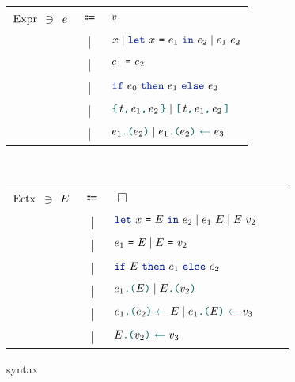 \begin{figure}[tp]
  \begin{tabular}{rcl}
            $\datalangExpr[]$
            $\ni$
            $\datalangExpr$
            & $\Coloneqq$ &
            $\datalangVal$
        \\
            & | &
            $\datalangVar \mid \datalangLet{\datalangVar}{\datalangExpr_1}{\datalangExpr_2} \mid \datalangCall{\datalangExpr_1}{\datalangExpr_2}$
        \\
            & | &
            $\datalangEq{\datalangExpr_1}{\datalangExpr_2}$
        \\
            & | &
            $\datalangIf{\datalangExpr_0}{\datalangExpr_1}{\datalangExpr_2}$
        \\
            & | &
            $\datalangBlock{\datalangTag}{\datalangExpr_1}{\datalangExpr_2} \mid \datalangBlockDet{\datalangTag}{\datalangExpr_1}{\datalangExpr_2}$
        \\
            & | &
            $\datalangLoad{\datalangExpr_1}{\datalangExpr_2} \mid \datalangStore{\datalangExpr_1}{\datalangExpr_2}{\datalangExpr_3}$
  \end{tabular}~
  \begin{tabular}{lclcl}
            $\datalangEctx[]$
            $\ni$
            $\datalangEctx$
            & $\Coloneqq$ &
            $\Box$
        \\
            & | &
            $\datalangLet{\datalangVar}{\datalangEctx}{\datalangExpr_2} \mid \datalangCall{\datalangExpr_1}{\datalangEctx} \mid \datalangCall{\datalangEctx}{\datalangVal_2}$
        \\
            & | &
            $\datalangEq{\datalangExpr_1}{\datalangEctx} \mid \datalangEq{\datalangEctx}{\datalangVal_2}$
        \\
            & | &
            $\datalangIf{\datalangEctx}{\datalangExpr_1}{\datalangExpr_2}$
        \\
            & | &
            $\datalangLoad{\datalangExpr_1}{\datalangEctx} \mid \datalangLoad{\datalangEctx}{\datalangVal_2}$
        \\
            & | &
            $\datalangStore{\datalangExpr_1}{\datalangExpr_2}{\datalangEctx}
             \mid \datalangStore{\datalangExpr_1}{\datalangEctx}{\datalangVal_3}$
         \\ & | & $\datalangStore{\datalangEctx}{\datalangVal_2}{\datalangVal_3}$
  \end{tabular}
    \caption{\DataLang syntax}
    \label{fig:syntax}
\end{figure}

